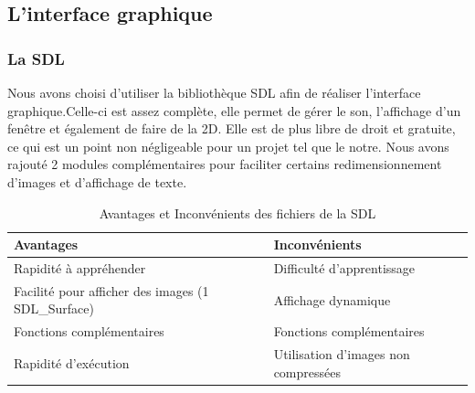\documentclass[light]{ceri}
\begin{document}
\subsection{L'interface graphique}
\subsubsection{La SDL}
\indent Nous avons choisi d'utiliser la bibliothèque SDL afin de réaliser l'interface graphique.Celle-ci est assez complète, elle permet de gérer le son, l'affichage d'un fenêtre et également de faire de la 2D. Elle est de plus libre de droit et gratuite, ce qui est un point non négligeable pour un projet tel que le notre. Nous avons rajouté 2 modules complémentaires pour faciliter certains redimensionnement d'images et d'affichage de texte. \\
\begin{table}[!h]

    \centering
    \begin{tabular}{|p{8cm}|p{8cm}|}
    \hline
        \rowcolor{yellow} Avantages  & Inconvénients   \tabularnewline \hline
        Rapidité à appréhender  & Difficulté d'apprentissage\tabularnewline \hline
        Facilité pour afficher des images (1 SDL\_Surface) &  Affichage dynamique\tabularnewline \hline
       Fonctions complémentaires &   Fonctions complémentaires\tabularnewline \hline
       Rapidité d'exécution  &   Utilisation d'images non compressées\tabularnewline \hline
  
        
    \end{tabular}
    \caption{Avantages et Inconvénients des fichiers de la SDL}
    \label{table1:SDL}
\end{table} \\
\end{document}
